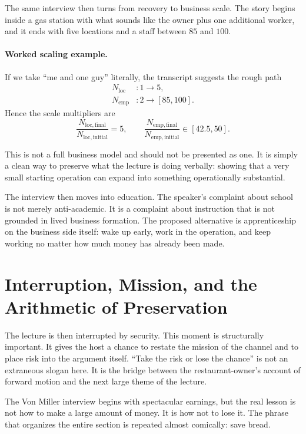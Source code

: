 The same interview then turns from recovery to business scale. The story begins inside a gas station with what sounds like the owner plus one additional worker, and it ends with five locations and a staff between \(85\) and \(100\).

\paragraph{Worked scaling example.}
If we take ``me and one guy'' literally, the transcript suggests the rough path
\begin{align}
N_{\mathrm{loc}} &: 1 \to 5,\\
N_{\mathrm{emp}} &: 2 \to [85,100].
\end{align}
Hence the scale multipliers are
\begin{equation}
\frac{N_{\mathrm{loc,final}}}{N_{\mathrm{loc,initial}}} = 5,
\qquad
\frac{N_{\mathrm{emp,final}}}{N_{\mathrm{emp,initial}}} \in [42.5,50].
\end{equation}

This is not a full business model and should not be presented as one. It is simply a clean way to preserve what the lecture is doing verbally: showing that a very small starting operation can expand into something operationally substantial.

The interview then moves into education. The speaker's complaint about school is not merely anti-academic. It is a complaint about instruction that is not grounded in lived business formation. The proposed alternative is apprenticeship on the business side itself: wake up early, work in the operation, and keep working no matter how much money has already been made.

\section{Interruption, Mission, and the Arithmetic of Preservation}

The lecture is then interrupted by security. This moment is structurally important. It gives the host a chance to restate the mission of the channel and to place risk into the argument itself. ``Take the risk or lose the chance'' is not an extraneous slogan here. It is the bridge between the restaurant-owner's account of forward motion and the next large theme of the lecture.

The Von Miller interview begins with spectacular earnings, but the real lesson is not how to make a large amount of money. It is how not to lose it. The phrase that organizes the entire section is repeated almost comically: save bread.

